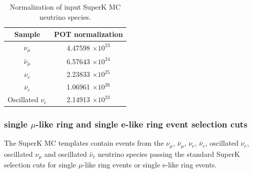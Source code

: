 \begin{table}
\centering
\begin{tabular}{| c | c |}
\hline
Sample             &  POT normalization \\
\hline             
$\nu_{\mu}$            & 4.47598 $\times 10^{23}$ \\
$\bar{\nu}_{\mu}$      & 6.57643 $\times 10^{24}$ \\
$\nu_{e}$              & 2.23833 $\times 10^{25}$ \\
$\bar{\nu}_{e}$        & 1.06961 $\times 10^{26}$ \\
Oscillated $\nu_{e}$   & 2.14913 $\times 10^{23}$ \\
\hline
\end{tabular}
\caption{
  Normalization of input SuperK MC neutrino species.
}
\label{tab:SKMCSummary}
\end{table}



\subsubsection{single $\mu$-like ring and single e-like ring event selection cuts}
\label{sec:prediction:nominal:cuts}


The SuperK MC templates contain events from the 
$\nu_{\mu}$, $\bar{\nu}_{\mu}$, $\nu_{e}$, $\bar{\nu}_{e}$, oscillated $\nu_{e}$, oscillated $\nu_{\mu}$ and oscillated $\bar{\nu}_{e}$ neutrino species
passing the standard SuperK selection cuts for single $\mu$-like ring events or single e-like ring events.

